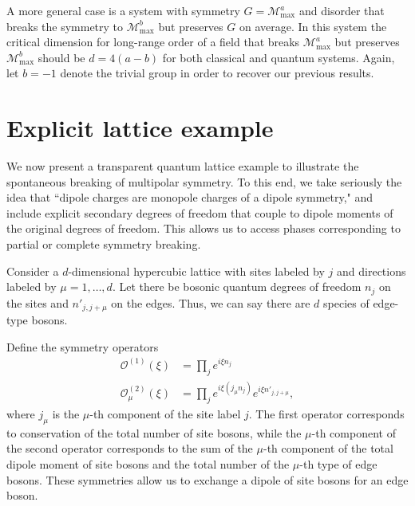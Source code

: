 \documentclass[pra,aps,twocolumn, amsfonts,amsmath,amssymb,nofootinbib,superscriptaddress]{revtex4-2}
\newcommand{\todo}[1]{\textcolor{orange}{#1}}
\newcommand{\op}[1]{\mathcal{O}^{(#1)}}
\newcommand{\nn}{\nonumber\\}
\renewcommand{\max}{\text{max}}
\newcommand{\mmax}[1]{\mathcal{M}^{#1}_\max}
\begin{document}
A more general case is a system with symmetry $G = \mathcal{M}_\max^a$ and disorder that breaks the symmetry to $\mathcal{M}_\max^b$ but preserves $G$ on average. In this system the critical dimension for long-range order of a field that breaks $\mmax{a}$ but preserves $\mmax{b}$ should be $d=4(a-b)$ for both classical and quantum systems. Again, let $b=-1$ denote the trivial group in order to recover our previous results.


\section{Explicit lattice example} \label{sec:example}

We now present a transparent quantum lattice example to illustrate the spontaneous breaking of multipolar symmetry. To this end, we take seriously the idea that ``dipole charges are monopole charges of a dipole symmetry," and include explicit secondary degrees of freedom that couple to dipole moments of the original degrees of freedom. This allows us to access phases corresponding to partial or complete symmetry breaking. 

Consider a $d$-dimensional hypercubic lattice with sites labeled by $j$ and directions labeled by $\mu = 1,\dots,d$. Let there be bosonic quantum degrees of freedom $n_j$ on the sites and $n'_{j,j+\mu}$ on the edges. Thus, we can say there are $d$ species of edge-type bosons.

Define the symmetry operators
\begin{align}
\op{1}(\xi) &= \prod_je^{i\xi n_j}\nn
\op{2}_\mu(\xi) &= \prod_j e^{i\xi (j_\mu n_j)}e^{i\xi n'_{j,j+\mu}},
\end{align}
where $j_\mu$ is the $\mu$-th component of the site label $j$.
The first operator corresponds to conservation of the total number of site bosons, while the $\mu$-th component of the second operator corresponds to the sum of the $\mu$-th component of the total dipole moment of site bosons and the total number of the $\mu$-th type of edge bosons. These symmetries allow us to exchange a dipole of site bosons for an edge boson. 
\end{document}
